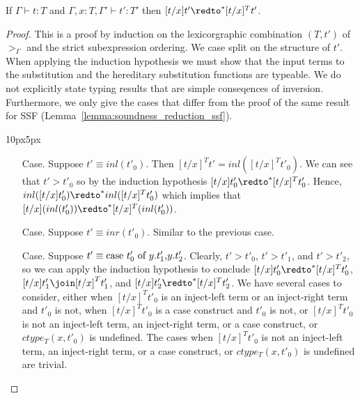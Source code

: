\begin{lemma}
  \label{lemma:soundness_reduction_ssfp}
  If $\Gamma \vdash t : T$ and $\Gamma, x:T, \Gamma' \vdash t':T'$ then
  $[t/x]t' \redto^* [t/x]^T t'$.
\end{lemma}
\begin{proof}
  This is a proof by induction on the lexicorgraphic combination
  $(T, t')$ of $>_\Gamma$ and the strict subexpression ordering.
  We case split on the structure of $t'$.  When applying the induction
  hypothesis we must show that the input terms to the substitution and
  the hereditary substitution functions are typeable.  We do not
  explicitly state typing results that are simple conseqences of
  inversion.  Furthermore, we only give the cases that differ from the
  proof of the same result for SSF
  (Lemma~\ref{lemma:soundness_reduction_ssf}).
  \vspace{-25px}
  \begin{changemargin}{10px}{5px}\noindent
  \begin{itemize}
  \item[Case.] Suppose $t' \equiv inl(t'_0)$.  Then $[t/x]^T t' = inl([t/x]^T t'_0)$.  We can
    see that $t' > t'_0$ so by the induction hypothesis $[t/x]t'_0 \redto^* [t/x]^T t'_0$.  Hence,
    $inl([t/x]t'_0) \redto^* inl([t/x]^T t'_0)$ which implies that 
    $[t/x](inl(t'_0)) \redto^* [t/x]^T (inl(t'_0))$.
    
  \item[Case.] Suppose $t' \equiv inr(t'_0)$.  Similar to the previous case.
    
  \item[Case.] Suppose $t' \equiv \mbox{case}\ t'_0\ \text{of}\ y\text{.}t'_1\text{,}y\text{.}t'_2$.  Clearly, $t' > t'_0$,
    $t' > t'_1$, and $t' > t'_2$, so we can apply the induction hypothesis to conclude 
    $[t/x]t'_0 \redto^* [t/x]^T t'_0$, $[t/x]t'_1 \join [t/x]^T t'_1$, and 
    $[t/x]t'_2 \redto^* [t/x]^T t'_2$.  We have several cases to consider, either when $[t/x]^T t'_0$ is an
    inject-left term or an inject-right term and $t'_0$ is not, when $[t/x]^T t'_0$ is a case construct
    and $t'_0$ is not, or $[t/x]^T t'_0$ is not an inject-left term, an inject-right term, or a case construct, or
    $ctype_T(x,t'_0)$ is undefined.  The cases when $[t/x]^T t'_0$ is not an inject-left term, an inject-right term, 
    or a case construct, or $ctype_T(x,t'_0)$ is undefined are trivial.
    

\end{itemize}
\end{changemargin}
\end{proof}
